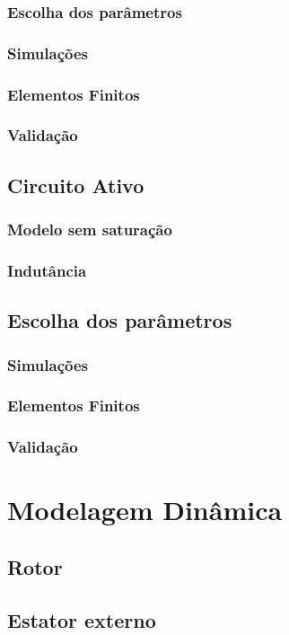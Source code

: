 \documentclass[a4paper,10pt]{report}
\begin{document}
\subsection{Escolha dos parâmetros}
\subsection{Simulações}
\subsection{Elementos Finitos}
\subsection{Validação}

\section{Circuito Ativo}
\subsection{Modelo sem saturação}
\subsection{Indutância} \label{subsec:at:indutancia}
\section{Escolha dos parâmetros}
\subsection{Simulações}
\subsection{Elementos Finitos}
\subsection{Validação}

\chapter{Modelagem Dinâmica} \label{Cap:Modelagem:Dinamica}
\section{Rotor}
\section{Estator externo}
\end{document}
